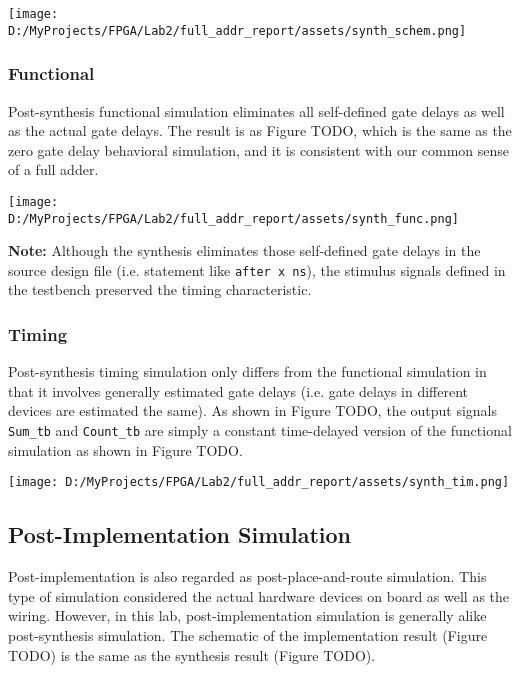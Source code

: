 \documentclass[
]{article}
\begin{document}
\texttt{[image: D:/MyProjects/FPGA/Lab2/full\_addr\_report/assets/synth\_schem.png]}

\hypertarget{functional}{%
\subsubsection{Functional}\label{functional}}

Post-synthesis functional simulation eliminates all self-defined gate
delays as well as the actual gate delays. The result is as Figure TODO,
which is the same as the zero gate delay behavioral simulation, and it
is consistent with our common sense of a full adder.

\texttt{[image: D:/MyProjects/FPGA/Lab2/full\_addr\_report/assets/synth\_func.png]}

\textbf{Note:} Although the synthesis eliminates those self-defined gate
delays in the source design file (i.e. statement like
\texttt{after\ x\ ns}), the stimulus signals defined in the testbench
preserved the timing characteristic.

\hypertarget{timing}{%
\subsubsection{Timing}\label{timing}}

Post-synthesis timing simulation only differs from the functional
simulation in that it involves generally estimated gate delays (i.e.
gate delays in different devices are estimated the same). As shown in
Figure TODO, the output signals \texttt{Sum\_tb} and \texttt{Count\_tb}
are simply a constant time-delayed version of the functional simulation
as shown in Figure TODO.

\texttt{[image: D:/MyProjects/FPGA/Lab2/full\_addr\_report/assets/synth\_tim.png]}

\hypertarget{post-implementation-simulation}{%
\subsection{Post-Implementation
Simulation}\label{post-implementation-simulation}}

Post-implementation is also regarded as post-place-and-route simulation.
This type of simulation considered the actual hardware devices on board
as well as the wiring. However, in this lab, post-implementation
simulation is generally alike post-synthesis simulation. The schematic
of the implementation result (Figure TODO) is the same as the synthesis
result (Figure TODO).
\end{document}
